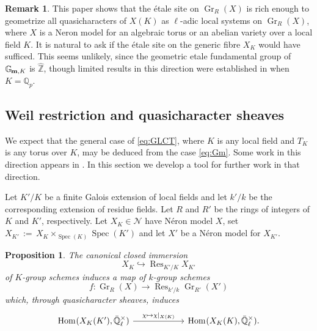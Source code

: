 \documentclass[10pt]{amsart}
\theoremstyle{plain}
\newtheorem{proposition}[theorem]{Proposition}
\theoremstyle{definition}
\newtheorem{remark}[theorem]{Remark}
\newcommand{\ZZ}{{\mathbb{Z}}}
\newcommand{\EE}{\mathbb{\bar Q}_\ell}
\newcommand{\Fq}{k}
\newcommand{\EEx}{\EE^\times}
\newcommand{\Gm}[1]{\mathbb{G}_{\hskip-1pt\textbf{m},#1}}
\DeclareMathOperator{\Hom}{Hom}
\DeclareMathOperator{\Gr}{Gr}
\DeclareMathOperator{\Res}{Res}
\newcommand{\Spec}[1]{{\operatorname{Spec}(#1)}}
\newcommand{\ceq}{{\, :=\, }}
\begin{document}
\begin{remark}
This paper shows that the \'etale site on $\Gr_R(X)$ is rich enough to geometrize all quasicharacters of $X(K)$ as $\ell$-adic local systems on $\Gr_R(X)$, where $X$ is a Neron model for an algebraic torus or an abelian variety over a local field $K$. 
It is natural to ask if the \'etale site on the generic fibre $X_K$ would have sufficed. 
This seems unlikely, since the geometric etale fundamental group of $\Gm{K}$ is ${\hat \ZZ}$, though limited results in this direction were established in \cite{Cunningham-Kamgarpour} when $K = \mathbb{Q}_p$.
\end{remark}

\subsection{Weil restriction and quasicharacter sheaves}\label{ssec:wrK}

We expect that the general case of \eqref{eq:GLCT}, where $K$ is any local field and $T_K$ is any torus over $K$, may be deduced from the case \eqref{eq:Gm}.
Some work in this direction appears in \cite{Suzuki:Neron}.
In this section we develop a tool for further work in that direction.

Let $K'/K$ be a finite Galois extension of local fields and
let $k'/k$ be the corresponding extension of residue fields.
Let $R$ and $R'$ be the rings of integers of $K$ and $K'$, respectively.
Let $X_K \in \mathcal{N}$ have N\'eron model $X$, set $X_{K'} \ceq X_K \times_\Spec{K} \Spec{K'}$
and let $X'$ be a N\'eron model for $X_{K'}$.

\begin{proposition}\label{prop:wrK}
The canonical closed immersion 
\[
X_K \hookrightarrow \Res_{K'/K} X_{K'}
\]
of $K$-group schemes
induces a map of $\Fq$-group schemes 
\[
f : \Gr_R(X) \to \Res_{k'/k} \Gr_{R'}(X')
\] 
which, through quasicharacter sheaves, induces
\[
\begin{tikzcd}[column sep=60]
\Hom_{\text{}}(X_K(K'), \EEx) \arrow{r}{\chi \mapsto \chi\vert_{X(K)}} &\Hom_{\text{}}(X_K(K), \EEx).
\end{tikzcd}
\]
\end{proposition}
\end{document}
